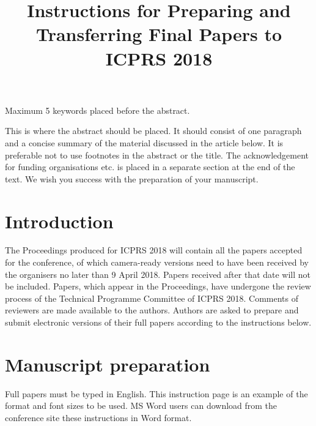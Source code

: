 \documentclass[10pt]{article}
\begin{document}
\noindent



\title{Instructions for Preparing and Transferring Final Papers to \\ICPRS 2018}




\maketitle

\keywords
Maximum 5 keywords placed before the abstract.

\abstract
This is where the abstract should be placed. It should consist
of one paragraph and a concise summary of the material
discussed in the article below. It is preferable not to use
footnotes in the abstract or the title. The acknowledgement
for funding organisations etc. is placed in a separate section at
the end of the text. We wish you success with the preparation
of your manuscript.

\section{Introduction}
The Proceedings produced for ICPRS 2018 will contain all the
papers accepted for the conference, of which camera-ready versions
need to have been received
by the organisers no later than 9 April 2018. Papers
received after that date will not be included. Papers, which
appear in the Proceedings, have undergone the review process
of the Technical Programme Committee of ICPRS 2018.
Comments of reviewers are made available to the authors. Authors are
asked to prepare and submit electronic versions of their full
papers according to the instructions below.

\section{Manuscript preparation}
Full papers must be typed in English. This instruction page is
an example of the format and font sizes to be used. MS Word
users can download from the conference site these
instructions in Word format.
\end{document}
